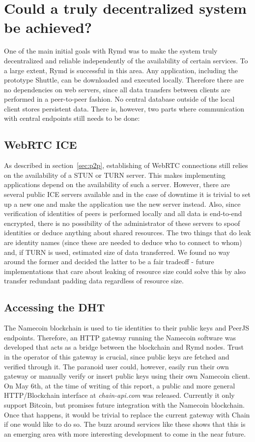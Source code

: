 \section{Could a truly decentralized system be achieved?}
One of the main initial goals with Rymd was to make the system truly decentralized and reliable independently of the availability of certain services. To a large extent, Rymd is successful in this area. Any application, including the prototype Shuttle, can be downloaded and executed locally. Therefore there are no dependencies on web servers, since all data transfers between clients are performed in a peer-to-peer fashion. No central database outside of the local client stores persistent data. There is, however, two parts where communication with central endpoints still needs to be done:

\subsection{WebRTC ICE}
As described in section~\ref{sec:p2p}, establishing of WebRTC connections still relies on the availability of a STUN or TURN server. This makes implementing applications depend on the availability of such a server. However, there are several public ICE servers available and in the case of downtime it is trivial to set up a new one and make the application use the new server instead. Also, since verification of identities of peers is performed locally and all data is end-to-end encrypted, there is no possibility of the administrator of these servers to spoof identities or deduce anything about shared resources. The two things that do leak are identity names (since these are needed to deduce who to connect to whom) and, if TURN is used, estimated size of data transferred. We found no way around the former and decided the latter to be a fair tradeoff - future implementations that care about leaking of resource size could solve this by also transfer redundant padding data regardless of resource size.

\subsection{Accessing the DHT}
The Namecoin blockchain is used to tie identities to their public keys and PeerJS endpoints. Therefore, an HTTP gateway running the Namecoin software was developed that acts as a bridge between the blockchain and Rymd nodes. Trust in the operator of this gateway is crucial, since public keys are fetched and verified through it. The paranoid user could, however, easily run their own gateway or manually verify or insert public keys using their own Namecoin client. On May 6th, at the time of writing of this report, a public and more general HTTP/Blockchain interface at \emph{chain-api.com}\cite{Chain:2014:Online} was released. Currently it only support Bitcoin, but promises future integration with the Namecoin blockchain. Once that happens, it would be trivial to replace the current gateway with Chain if one would like to do so. The buzz around services like these shows that this is an emerging area with more interesting development to come in the near future.

